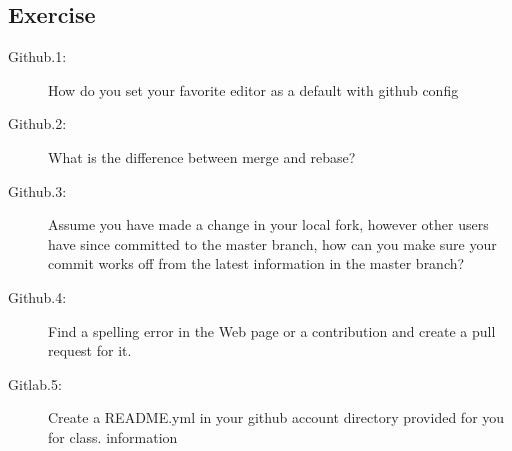 \subsection{Exercise}\label{exercise}

\begin{description}
\item[Github.1:]
How do you set your favorite editor as a default with github config
\item[Github.2:]
What is the difference between merge and rebase?
\item[Github.3:]
Assume you have made a change in your local fork, however other users
have since committed to the master branch, how can you make sure your
commit works off from the latest information in the master branch?
\item[Github.4:]
Find a spelling error in the Web page or a contribution and create a
pull request for it.
\item[Gitlab.5:] Create a README.yml in your github account directory
  provided for you for class.
information

\end{description}
